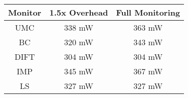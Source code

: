 

\begin{tabular}{|c|c|c|}
\hline

{\bf Monitor} & {\bf 1.5x Overhead} & {\bf Full Monitoring} \\ \hline\hline

UMC  & 338 mW & 363 mW \\ \hline
BC   & 320 mW & 343 mW \\ \hline
DIFT & 304 mW & 304 mW \\ \hline
IMP  & 345 mW & 367 mW \\ \hline
LS   & 327 mW & 327 mW \\ \hline

\end{tabular}

